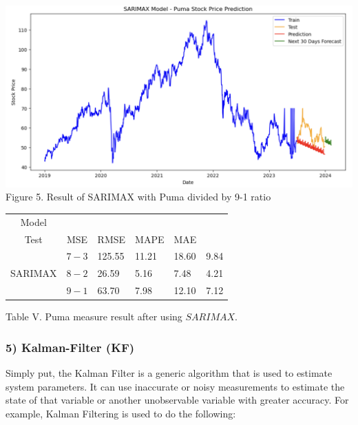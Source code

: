 \documentclass[conference]{IEEEtran}
\begin{document}
{\begin{itemize}
\end{itemize}
\begin{center}
\includegraphics[max width=\linewidth]{SARIMAX(PUMA).png}
Figure 5. Result of SARIMAX with Puma divided by 9-1 ratio
\end{center}
\begin{table}[H]
\centering
\begin{tabularx}{\columnwidth}{|c|c|X|X|X|X|}
\hline
Model & \begin{tabular}{c}
Train- \\
Test
\end{tabular} & MSE & RMSE & MAPE & MAE \\
\hline
\multirow{3}{*}{SARIMAX} & $7-3$ & 125.55 & 11.21 & 18.60 & 9.84 \\
\cline{2-6}
 & $8-2$ & 26.59 & 5.16 & 7.48 & 4.21 \\
\cline{2-6}
 & $9-1$ & 63.70 & 7.98 & 12.10 & 7.12 \\
\hline
\end{tabularx}
\end{table}
Table V. Puma measure result after using $SARIMAX$.
\newline
\subsubsection*{\textbf{5) Kalman-Filter (KF)}}
Simply put, the Kalman Filter is a generic algorithm that is used to estimate system parameters. It can use inaccurate or noisy measurements to estimate the state of that variable or another unobservable variable with greater accuracy. For example, Kalman Filtering is used to do the following:

}
\end{document}
